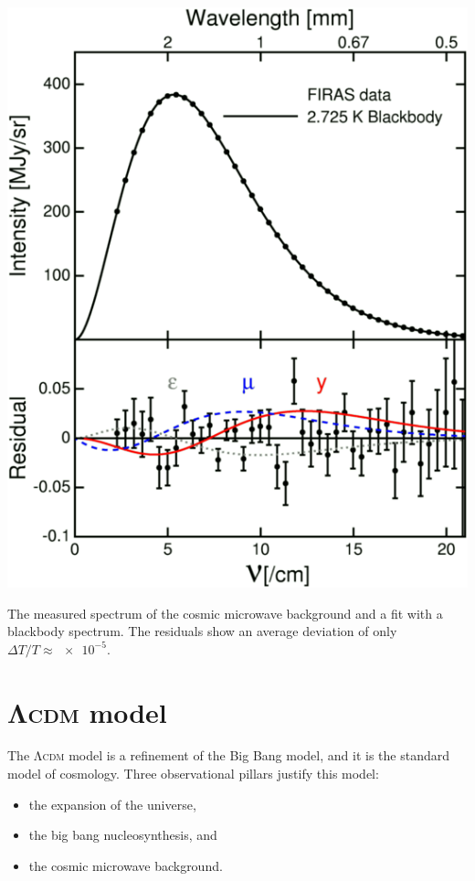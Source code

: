 \begin{marginfigure}
	\centering
	\includegraphics[width=\textwidth]{img/ch-02/cmb.png}
	\caption{The measured spectrum of the cosmic microwave background and a fit with a blackbody spectrum. The residuals show an average deviation of only $\Delta T / T \approx \num{e-5}$.}
	\label{fig:cmb}
\end{marginfigure}




\section{\textsc{Λcdm} model}

The \textsc{Λcdm} model is a refinement of the Big Bang model, and it is the standard model of cosmology. Three observational pillars justify this model:
\begin{itemize}[noitemsep, nolistsep]
	\item the expansion of the universe,
	\item the big bang nucleosynthesis, and
	\item the cosmic microwave background.
\end{itemize}

